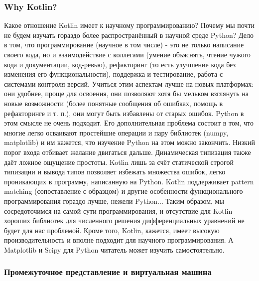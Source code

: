 \documentclass{book}
\begin{document}
\subsubsection{Why Kotlin?}

Какое отношение Kotlin имеет к научному программированию? Почему мы почти не будем изучать гораздо
более распространённый в научной среде Python? Дело в том, что программирование (научное в том числе) - это не
только написание своего кода, но и взаимодействие с коллегами (умение объяснять, чтение чужого кода
и документации, код-ревью), рефакторинг (то есть улучшение кода без изменения его
функциональности), поддержка и тестирование, работа с системами контроля версий. Учиться этим
аспектам лучше на новых платформах: они удобнее, проще для освоения, они позволяют хотя бы мельком
взглянуть на новые возможности (более понятные сообщения об ошибках, помощь в рефакторинге и т.
п.), они могут быть избавлены от старых ошибок. Python в этом смысле не очень подходит. Его
дополнительная проблема состоит в том, что многие легко осваивают простейшие операции и пару библиотек (numpy,
matplotlib) и им кажется, что изучение Python на этом можно закончить. Низкий порог входа отбивает
желание двигаться дальше. Динамическая типизация также даёт ложное ощущение простоты. Kotlin лишь
за счёт статической строгой типизации и вывода типов позволяет избежать множества ошибок, легко
проникающих в программу, написанную на Python. Kotlin поддерживает pattern matching (сопоставление
с образцом) и другие особенности функционального программирования гораздо лучше, нежели Python...
Таким образом,  мы сосредоточимся на  самой сути программирования, и отсутствие для Kotlin хороших
библиотек для численного решения дифференциальных уравнений не будет для
нас проблемой. Кроме того, Kotlin, кажется, имеет высокую производительность и вполне подходит для
научного программирования. А Matplotlib и Scipy для Python читатель может изучить самостоятельно.


\subsubsection{Промежуточное представление и виртуальная машина}
\end{document}
